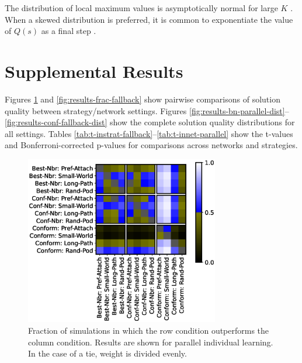 \documentclass[twocolumn,10pt]{article}
\begin{document}
The distribution of local maximum values is asymptotically normal for large $K$ \cite{weinberger_local_1991}.
When a skewed distribution is preferred, it is common to exponentiate the value of $Q(s)$ as a final step \cite{lazer_network_2007, barkoczi_social_2016, gomez_clustering_2019}.

\section{Supplemental Results}

Figures \ref{fig:results-frac-parallel} and \ref{fig:results-frac-fallback} show pairwise comparisons of solution quality between strategy/network settings. Figures \ref{fig:results-bn-parallel-dist}--\ref{fig:results-conf-fallback-dist} show the complete solution quality distributions for all settings.
Tables \ref{tab:t-instrat-fallback}--\ref{tab:t-innet-parallel} show the t-values and Bonferroni-corrected p-values for comparisons across networks and strategies.

\begin{figure}
    \label{fig:results-frac-parallel}
    \centering
    \includegraphics[width=3.33in]{fig-result-frac-parallel.eps}
\caption{Fraction of simulations in which the row condition outperforms the column condition. Results are shown for parallel individual learning. In the case of a tie, weight is divided evenly.}
\end{figure}
\end{document}
